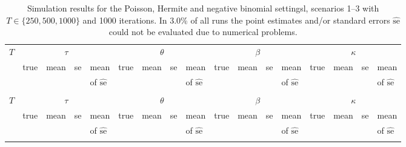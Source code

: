 \documentclass{article}
\begin{document}
\newpage


\begin{table}[h!]
\footnotesize
\caption{Simulation results for the Poisson, Hermite and negative binomial settingsl, scenarios 1--3 with $T \in \{250, 500, 1000\}$ and 1000 iterations. In 3.0\% of all runs the point estimates and/or standard errors $\widehat{\text{se}}$ could not be evaluated due to numerical problems.}
\label{tab:sim_ml}

\center
\medskip
\begin{tabular}{p{0.3cm} @{\hskip 0.7cm} p{0.45cm} p{0.45cm} p{0.45cm} p{0.45cm} @{\hskip 0.7cm} p{0.45cm} p{0.45cm} p{0.45cm} p{0.45cm} @{\hskip 0.7cm} p{0.45cm} p{0.45cm} p{0.45cm} p{0.45cm} @{\hskip 0.7cm} p{0.45cm} @{\hskip 0.45cm} p{0.45cm} p{0.45cm} p{0.65cm}}
\hline\noalign{\bigskip}
\multicolumn{17}{c}{Poisson}\\
\hline\noalign{\smallskip}
$T$ & \multicolumn{4}{c}{$\tau$} & \multicolumn{4}{c}{$\theta$} & \multicolumn{4}{c}{$\beta$} & \multicolumn{4}{c}{$\kappa$}\\
 \noalign{\smallskip}\hline\noalign{\smallskip}
& true & mean & se & mean & true & mean & se & mean & true & mean & se & mean & true & mean & se & mean \\
& & & & of $\widehat{\text{se}}$ & & & & of $\widehat{\text{se}}$ & & & & of $\widehat{\text{se}}$ & & & & of $\widehat{\text{se}}$\\
\noalign{\smallskip}\hline\noalign{\smallskip}

\noalign{\smallskip}\hline\noalign{\smallskip}

\noalign{\smallskip}\hline\noalign{\smallskip}

\hline\noalign{\bigskip}
\multicolumn{17}{c}{Hermite}\\
\hline\noalign{\smallskip}
$T$ & \multicolumn{4}{c}{$\tau$} & \multicolumn{4}{c}{$\theta$} & \multicolumn{4}{c}{$\beta$} & \multicolumn{4}{c}{$\kappa$}\\
 \noalign{\smallskip}\hline\noalign{\smallskip}
& true & mean & se & mean & true & mean & se & mean & true & mean & se & mean & true & mean & se & mean \\
& & & & of $\widehat{\text{se}}$ & & & & of $\widehat{\text{se}}$ & & & & of $\widehat{\text{se}}$ & & & & of $\widehat{\text{se}}$\\
\noalign{\smallskip}\hline\noalign{\smallskip}

\noalign{\smallskip}\hline\noalign{\smallskip}

\noalign{\smallskip}\hline\noalign{\smallskip}

\noalign{\smallskip}\hline\noalign{\bigskip}

\end{tabular}
\end{table}
\end{document}
